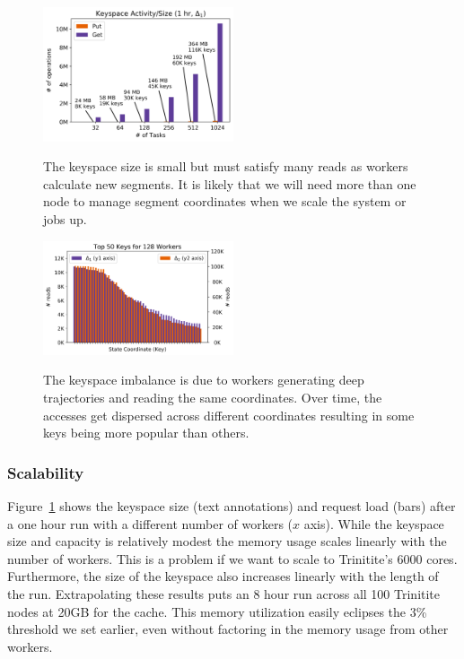 \begin{figure}[t]
  \noindent\includegraphics[width=0.5\textwidth]{figures/methodology-keyspace.png}\\
  \caption{The keyspace size is small but must satisfy many reads as workers
  calculate new segments. It is likely that we will need
  more than one node to manage segment coordinates when we scale the system or jobs up.
  \label{fig:methodology-keyspace}}
\end{figure}

\begin{figure}[t]
  \noindent\includegraphics[width=0.5\textwidth]{figures/methodology-keys.png}\\
  \caption{The keyspace imbalance is due to workers generating deep
  trajectories and reading the same coordinates. Over time, the accesses get
  dispersed across different coordinates resulting in some keys being more
  popular than others.\label{fig:methodology-keys}}
\end{figure}

\subsubsection*{Scalability} Figure~\ref{fig:methodology-keyspace} shows the
keyspace size (text annotations) and request load (bars) after a one hour run
with a different number of workers (\(x\) axis). While the keyspace size and
capacity is relatively modest the memory usage scales linearly with the number
of workers. This is a problem if we want to scale to Trinitite's 6000 cores.
Furthermore, the size of the keyspace also increases linearly with the length
of the run.  Extrapolating these results puts an 8 hour run across all 100
Trinitite nodes at 20GB for the cache.  This memory utilization easily eclipses
the 3\% threshold we set earlier, even without factoring in the memory usage
from other workers.

